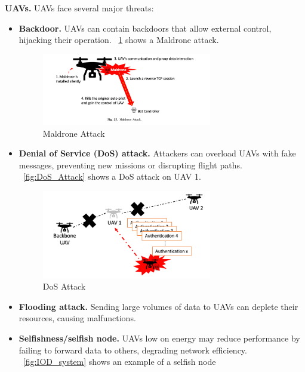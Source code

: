 \textbf{UAVs.} UAVs face several major threats:

\begin{itemize}
    \item \textbf{Backdoor.} UAVs can contain backdoors that allow external control, hijacking their operation. ~\ref{fig:Maldrone_Attack} shows a Maldrone attack.

    \begin{figure}[H]
        \centering
        \includegraphics[width=0.7\textwidth]{Figures/Chapter2/Section2/4.png}
        \caption{ Maldrone Attack ~\cite{tsao2022survey}}
        \label{fig:Maldrone_Attack}
    \end{figure}
    
    \item \textbf{Denial of Service (DoS) attack.} Attackers can overload UAVs with fake messages, preventing new missions or disrupting flight paths. ~\ref{fig:DoS_Attack} shows a DoS attack on UAV 1.

    \begin{figure}[H]
        \centering
        \includegraphics[width=0.7\textwidth]{Figures/Chapter2/Section2/5.png}
        \caption{  DoS Attack ~\cite{tsao2022survey}}
        \label{fig: DoS_Attack}
    \end{figure}
    
    \item \textbf{Flooding attack.} Sending large volumes of data to UAVs can deplete their resources, causing malfunctions.
    
    \item \textbf{Selfishness/selfish node.} UAVs low on energy may reduce performance by failing to forward data to others, degrading network efficiency. ~\ref{fig:IOD_system} shows an example of a selfish node


\end{itemize}
